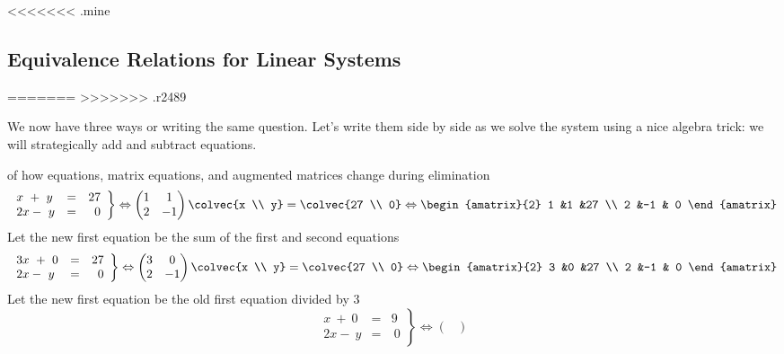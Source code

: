 <<<<<<< .mine
\subsection*{Equivalence Relations for Linear Systems}
=======
>>>>>>> .r2489

We now have three ways or writing the same question. 
Let's write them side by side as we solve the system using a nice algebra trick: we will strategically add and subtract  equations.

\begin{example} of how equations, matrix equations, and augmented matrices change during elimination
\[
   \left.
\begin{array}{lcr}
	x\ +\ y & = & 27 \\
	2x-\ y & = &\  0 
     \end{array}
   \right\} 
   \Leftrightarrow
    \begin{pmatrix}
      1             &1  \\
      2             &-1
    \end{pmatrix}
  \colvec{x \\ y}
  =
  \colvec{27 \\ 0}
  \Leftrightarrow
 \begin{amatrix}{2}
1 &1 &27 \\ 2 &-1 & 0
\end{amatrix}
\]
Let the new first equation be the sum of the first and second equations
\[
   \left.
\begin{array}{lcr}
	3x\ +\ 0 & = & 27 \\
	2x-\ y & = &\  0 
     \end{array}
   \right\} 
   \Leftrightarrow
    \begin{pmatrix}
      3             &0  \\
      2             &-1
    \end{pmatrix}
  \colvec{x \\ y}
  =
  \colvec{27 \\ 0}
  \Leftrightarrow
 \begin{amatrix}{2}
3 &0 &27 \\ 2 &-1 & 0
\end{amatrix}
\]
Let the new first equation be the old first equation divided by 3
\[
   \left.
\begin{array}{lcr}
	x\ +\ 0 & = & 9 \\
	2x-\ y & = &\  0 
     \end{array}
   \right\} 
   \Leftrightarrow
    \begin{pmatrix}

\end{pmatrix}\]
\end{example}

